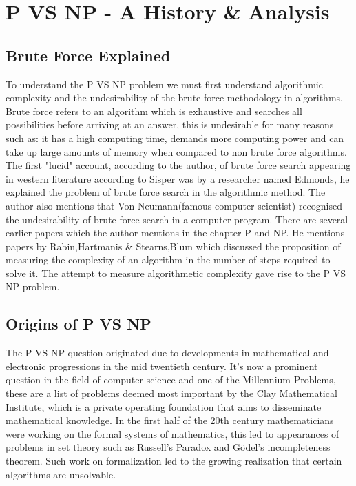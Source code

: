 \documentclass{report}
\begin{document}
\chapter{P VS NP - A History \& Analysis}
\section{Brute Force Explained}
To understand the P VS NP problem we must first understand algorithmic complexity and the undesirability of the brute force methodology in algorithms.
Brute force refers to an algorithm which is exhaustive and searches all possibilities before arriving at an answer, this is undesirable for many reasons such as: it has a high computing time, demands more computing power and can take up large amounts of memory when compared to non brute force algorithms. The first "lucid" account, according to the author, of brute force search appearing in western literature according to Sisper was by a researcher named Edmonds\cite{HistoryOfPVsNP}, he explained the problem of brute force search in the algorithmic method.  The author also mentions that Von Neumann(famous computer scientist\cite{Neumann}) recognised the undesirability of brute force search in a computer program. There are several earlier papers which the author mentions in the chapter P and NP. He mentions papers by Rabin\cite{ResearchPaperRabin},Hartmanis \& Stearns\cite{ResearchPaperHartmanis},Blum\cite{ResearchPaperBlum} which discussed the proposition of measuring the complexity of an algorithm in the number of steps required to solve it. The attempt to measure algorithmetic complexity gave rise to the P VS NP problem.
\section{Origins of P VS NP}
The P VS NP question originated due to developments in mathematical and electronic progressions in the mid twentieth century\cite{HistoryOfPVsNP}. It's now a prominent question in the field of computer science and one of the Millennium Problems\cite{Millennium}, these are a list of problems deemed most important by the Clay Mathematical Institute, which is a private operating foundation that aims to disseminate mathematical knowledge\cite{AboutMillennium}.  In the first half of the 20th century mathematicians were working on the formal systems of mathematics\cite{ResearchPaperFormalizeMathematics}, this led to appearances of problems in set theory such as Russell's Paradox\cite{RussellParadox} and Gödel's incompleteness theorem\cite{Godel}. Such work on formalization led to the growing realization that certain algorithms are unsolvable\cite{HistoryOfPVsNP}.
\end{document}
